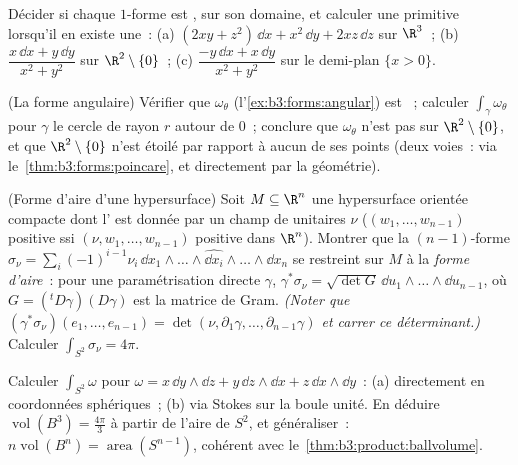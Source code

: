 \begin{exercise}[$\star\star$]\label{exo:b3:forms:3}
Décider si chaque $1$-forme est ,  sur son
domaine, et calculer une primitive lorsqu'il en existe une~:
(a) $(2xy + z^2)\,\dd x + x^2\,\dd y + 2xz\,\dd z$ sur
$\R^3$~;
(b) $\dfrac{x\,\dd x + y\,\dd y}{x^2 + y^2}$ sur
$\R^2\setminus\{0\}$~;
(c) $\dfrac{-y\,\dd x + x\,\dd y}{x^2 + y^2}$ sur le
demi-plan $\{x > 0\}$.
\end{exercise}

\begin{exercise}[$\star\star$]\label{exo:b3:forms:4}
(La forme angulaire) Vérifier que $\omega_\theta$
(l'\cref{ex:b3:forms:angular}) est ~; calculer
$\int_\gamma\omega_\theta$ pour $\gamma$ le cercle de rayon
$r$ autour de $0$~; conclure que $\omega_\theta$ n'est pas
 sur $\R^2\setminus\{0\}$, et que
$\R^2\setminus\{0\}$ n'est étoilé par rapport à aucun de ses
points (deux voies~: via le~\cref{thm:b3:forms:poincare}, et
directement par la géométrie).
\end{exercise}

\begin{exercise}[$\star\star$]\label{exo:b3:forms:5}
(Forme d'aire d'une hypersurface) Soit $M \subseteq \R^n$
une hypersurface orientée compacte dont l' est
donnée par un champ de  unitaires $\nu$ ($(w_1,
\dots, w_{n-1})$ positive ssi $(\nu, w_1, \dots,
w_{n-1})$ positive dans $\R^n$). Montrer que la
$(n-1)$-forme $\sigma_\nu =
\sum_i(-1)^{i-1}\nu_i\,\dd x_1\wedge\dots\wedge\widehat{\dd
x_i}\wedge\dots\wedge\dd x_n$ se restreint sur $M$ à la
\emph{forme d'aire}~: pour une paramétrisation directe
$\gamma$, $\gamma^*\sigma_\nu = \sqrt{\det G}\,\dd
u_1\wedge\dots \wedge\dd u_{n-1}$, où $G = ({}^t
D\gamma)(D\gamma)$ est la matrice de Gram. \emph{(Noter que
$(\gamma^*\sigma_\nu)(e_1, \dots, e_{n-1}) = \det(\nu,
\partial_1\gamma, \dots, \partial_{n-1}\gamma)$ et carrer ce
déterminant.)} Calculer $\int_{S^2}\sigma_\nu = 4\pi$.
\end{exercise}

\begin{exercise}[$\star\star$]\label{exo:b3:forms:6}
Calculer $\int_{S^2}\omega$ pour $\omega = x\,\dd y\wedge\dd
z + y\,\dd z\wedge\dd x + z\,\dd x\wedge\dd y$~: (a)
directement en coordonnées sphériques~; (b) via Stokes sur la
boule unité. En déduire $\operatorname{vol}(B^3) =
\frac{4\pi}3$ à partir de l'aire de $S^2$, et généraliser~:
$n\operatorname{vol}(B^n) = \operatorname{area}(S^{n-1})$,
cohérent avec le~\cref{thm:b3:product:ballvolume}.
\end{exercise}

